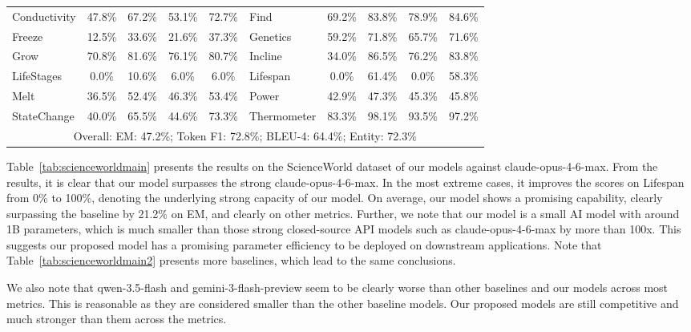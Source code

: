 \begin{table}[h]
\begin{tabular}{lcccc|lcccc}
Conductivity       &    47.8\%  &    67.2\%   & 53.1\%    &  72.7\% &
Find               &    69.2\%   &   83.8\%  &  78.9\%   &   84.6\% \\
Freeze              &    12.5\%  &    33.6\%  &  21.6\%    &  37.3\%&
Genetics          &    59.2\%   &   71.8\%  &  65.7\%    &  71.6\%\\
Grow               &    70.8\%  &    81.6\%  &  76.1\%   &   80.7\%&
Incline           &    34.0\%    &  86.5\%   & 76.2\%    &  83.8\%\\
LifeStages          &     0.0\%  &    10.6\% &    6.0\%   &    6.0\%&
Lifespan            &     0.0\%  &    61.4\%  &   0.0\%    &  58.3\%\\
Melt               &    36.5\%   &   52.4\%   & 46.3\%    &  53.4\%&
Power               &    42.9\%  &    47.3\%  &  45.3\%   &   45.8\%\\
StateChange         &    40.0\%   &   65.5\%  &  44.6\%   &   73.3\%&
Thermometer         &    83.3\%   &   98.1\%  &  93.5\%   &   97.2\%\\
\midrule
\multicolumn{10}{c}{Overall: EM: 47.2\%; Token F1: 72.8\%; BLEU-4: 64.4\%; Entity: 72.3\%}\\
\bottomrule
\end{tabular}
\end{table}

Table~\ref{tab:scienceworldmain} presents the results on the ScienceWorld dataset of our models against claude-opus-4-6-max. From the results, it is clear that our model surpasses the strong claude-opus-4-6-max. In the most extreme cases, it improves the scores on Lifespan from 0\% to 100\%, denoting the underlying strong capacity of our model. On average, our model shows a promising capability, clearly surpassing the baseline by 21.2\% on EM, and clearly on other metrics. Further, we note that our model is a small AI model with around 1B parameters, which is much smaller than those strong closed-source API models such as claude-opus-4-6-max by more than 100x. This suggests our proposed model has a promising parameter efficiency to be deployed on downstream applications. Note that Table~\ref{tab:scienceworldmain2} presents more baselines, which lead to the same conclusions.
\par
We also note that qwen-3.5-flash and gemini-3-flash-preview seem to be clearly worse than other baselines and our models across most metrics. This is reasonable as they are considered smaller than the other baseline models. Our proposed models are still competitive and much stronger than them across the metrics.



